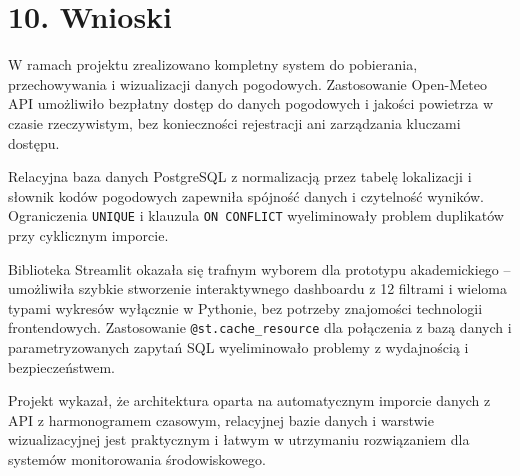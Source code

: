 \documentclass[12pt, a4paper]{article}
\begin{document}
\section*{\textbf{10. Wnioski}}

W ramach projektu zrealizowano kompletny system do pobierania, przechowywania
i wizualizacji danych pogodowych. Zastosowanie Open-Meteo API umożliwiło
bezpłatny dostęp do danych pogodowych i jakości powietrza w czasie rzeczywistym,
bez konieczności rejestracji ani zarządzania kluczami dostępu.

Relacyjna baza danych PostgreSQL z normalizacją przez tabelę lokalizacji
i słownik kodów pogodowych zapewniła spójność danych i czytelność wyników.
Ograniczenia \texttt{UNIQUE} i klauzula \texttt{ON CONFLICT} wyeliminowały
problem duplikatów przy cyklicznym imporcie.

Biblioteka Streamlit okazała się trafnym wyborem dla prototypu akademickiego --
umożliwiła szybkie stworzenie interaktywnego dashboardu z 12 filtrami i wieloma
typami wykresów wyłącznie w Pythonie, bez potrzeby znajomości technologii
frontendowych. Zastosowanie \texttt{@st.cache\_resource} dla połączenia z bazą
danych i parametryzowanych zapytań SQL wyeliminowało problemy z wydajnością
i bezpieczeństwem.

Projekt wykazał, że architektura oparta na automatycznym imporcie danych z API
z harmonogramem czasowym, relacyjnej bazie danych i warstwie wizualizacyjnej
jest praktycznym i łatwym w utrzymaniu rozwiązaniem dla systemów monitorowania
środowiskowego.
\end{document}
